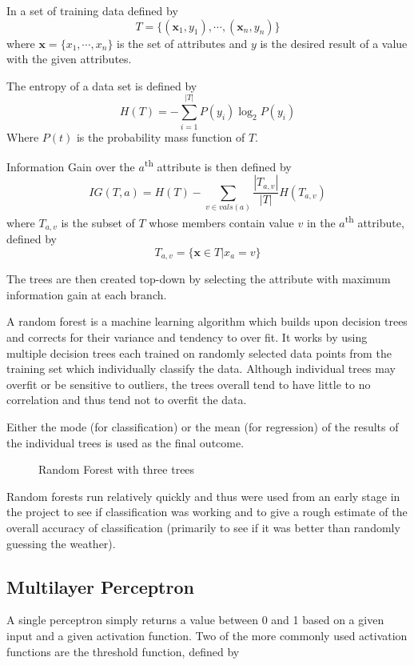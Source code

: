 \documentclass[a4paper,12pt,twoside]{report}
\begin{document}
In a set of training data defined by 
$$T = \{(\mathbf{x}_1, y_1), \cdots, (\mathbf{x}_n, y_n) \}$$
where $\mathbf{x} = \{x_1, \cdots, x_n\}$ is the set of attributes and $y$ is the desired result of a value with the given attributes.

The entropy of a data set is defined by
$$H(T) = -\sum_{i=1}^{|T|} P(y_i)\log_2 P(y_i)$$
Where $P(t)$ is the probability mass function of $T$.

Information Gain over the $a$\textsuperscript{th} attribute is then defined by 
$$IG(T, a) = H(T) - \sum_{v \in vals(a)} \frac{|T_{a,v}|}{|T|}H(T_{a,v})$$
where $T_{a,v}$ is the subset of $T$ whose members contain value $v$ in the $a$\textsuperscript{th} attribute, defined by
$$T_{a,v} = \{\mathbf{x} \in T | x_a = v\}$$

The trees are then created top-down by selecting the attribute with maximum information gain at each branch.

A random forest is a machine learning algorithm which builds upon decision trees and corrects for their variance and tendency to over fit. It works by using multiple decision trees each trained on randomly selected data points from the training set which individually classify the data. Although individual trees may overfit or be sensitive to outliers, the trees overall tend to have little to no correlation and thus tend not to overfit the data.

Either the mode (for classification) or the mean (for regression) of the results of the individual trees is used as the final outcome.

\begin{figure}[H]
  \centering
  
  \caption{Random Forest with three trees}
\end{figure}

Random forests run relatively quickly and thus were used from an early stage in the project to see if classification was working and to give a rough estimate of the overall accuracy of classification (primarily to see if it was better than randomly guessing the weather).

\subsection{Multilayer Perceptron}
A single perceptron simply returns a value between 0 and 1 based on a given input and a given activation function. Two of the more commonly used activation functions are the threshold function, defined by
\end{document}

